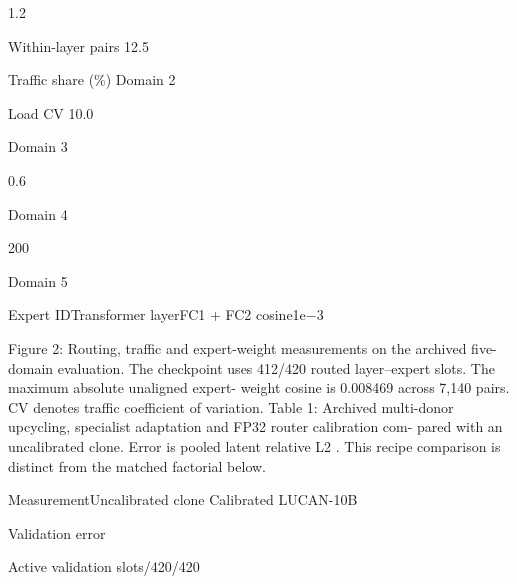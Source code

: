 \documentclass[11pt]{article}
\begin{document}
1.2




Within-layer pairs
12.5




Traffic share (\%)
Domain 2

\par



Load CV
10.0

\noindent Domain 3\par


\par

0.6

\noindent Domain 4\par

200

\par

Domain 5

\par


\par


\noindent Expert ID\quad Transformer layer\quad FC1 + FC2 cosine\quad 1e\ensuremath{-}3\par





Figure 2: Routing, traffic and expert-weight measurements on the archived five-domain evaluation.
The checkpoint uses 412/420 routed layer–expert slots. The maximum absolute unaligned expert-
weight cosine is 0.008469 across 7,140 pairs. CV denotes traffic coefficient of variation.
Table 1: Archived multi-donor upcycling, specialist adaptation and FP32 router calibration com-
pared with an uncalibrated clone. Error is pooled latent relative L2 . This recipe comparison is
distinct from the matched factorial below.


\noindent Measurement\quad Uncalibrated clone Calibrated LUCAN-10B\par


\noindent Validation error\par


\noindent Active validation slots/420/420\par
\end{document}
